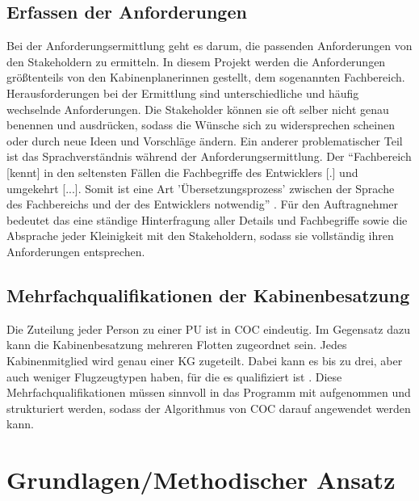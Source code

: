 \documentclass [12pt, a4paper, oneside, titlepage, ngerman]{article}
\begin{document}
\subsection{Erfassen der Anforderungen} \label{anforderungen}
Bei der Anforderungsermittlung geht es darum, die passenden Anforderungen von den Stakeholdern zu ermitteln. In diesem Projekt werden die Anforderungen größtenteils von den Kabinenplanerinnen gestellt, dem sogenannten Fachbereich. \\
Herausforderungen bei der Ermittlung sind unterschiedliche und häufig wechselnde Anforderungen. Die Stakeholder können sie oft selber nicht genau benennen und ausdrücken, sodass die Wünsche sich zu widersprechen scheinen oder durch neue Ideen und Vorschläge ändern. %
Ein anderer problematischer Teil ist das Sprachverständnis während der Anforderungsermittlung. Der "`Fachbereich [kennt] in den seltensten Fällen die Fachbegriffe des Entwicklers [.] und umgekehrt [...]. Somit ist eine Art 'Übersetzungsprozess' zwischen der Sprache des Fachbereichs und der des Entwicklers notwendig"' \cite[S.319]{Alpar2016} . 
Für den Auftragnehmer bedeutet das eine ständige Hinterfragung aller Details und Fachbegriffe sowie die Absprache jeder Kleinigkeit mit den Stakeholdern, sodass sie vollständig ihren Anforderungen entsprechen. \\



\subsection{Mehrfachqualifikationen der Kabinenbesatzung}
Die Zuteilung jeder Person zu einer \ac{PU} ist in \ac{COC} eindeutig.
Im Gegensatz dazu kann die Kabinenbesatzung mehreren Flotten zugeordnet sein. Jedes Kabinenmitglied wird genau einer \ac{KG} zugeteilt. Dabei kann es bis zu drei, aber auch weniger Flugzeugtypen haben, für die es qualifiziert ist \cite[vgl.][]{Gespraech2}. Diese Mehrfachqualifikationen müssen sinnvoll in das Programm mit aufgenommen und strukturiert werden, sodass der Algorithmus von \ac{COC} darauf angewendet werden kann.

\newpage

\section {Grundlagen/Methodischer Ansatz}
\end{document}
